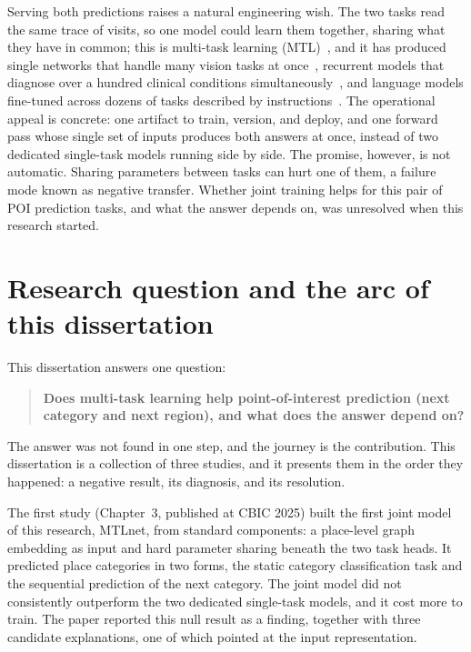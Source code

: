 Serving both predictions raises a natural engineering wish. The two tasks read the
same trace of visits, so one model could learn them together, sharing what they have
in common; this is multi-task learning (MTL)~\cite{caruana1997multitask}, and it has
produced single networks that handle many vision tasks at
once~\cite{kokkinos2016ubernet}, recurrent models that diagnose over a hundred
clinical conditions simultaneously~\cite{lipton2015learning}, and language models
fine-tuned across dozens of tasks described by
instructions~\cite{wei2022finetuned}. The operational appeal is
concrete: one artifact to train, version, and deploy, and one forward pass whose
single set of inputs produces both answers at once, instead of two dedicated
single-task models running side by side. The promise, however, is not automatic.
Sharing parameters between tasks can hurt one of them, a failure mode known as
negative transfer. Whether joint training helps for this pair of POI prediction
tasks, and what the answer depends on, was unresolved when this research started.

\section{Research question and the arc of this dissertation}
\label{sec:intro:arc}

This dissertation answers one question:

\begin{quote}
\textbf{Does multi-task learning help point-of-interest prediction (next category and
next region), and what does the answer depend on?}
\end{quote}

The answer was not found in one step, and the journey is the contribution. This
dissertation is a collection of three studies, and it presents them in the order they
happened: a negative result, its diagnosis, and its resolution.

The first study (Chapter~3, published at CBIC 2025) built the first joint model of
this research, MTLnet, from standard components: a place-level graph embedding as
input and hard parameter sharing beneath the two task heads. It predicted place
categories in two forms, the static category classification task and the sequential
prediction of the next category. The joint model did not consistently outperform the
two dedicated single-task models, and it cost more to train. The paper reported this
null result as a finding, together with three candidate explanations, one of which
pointed at the input representation.

